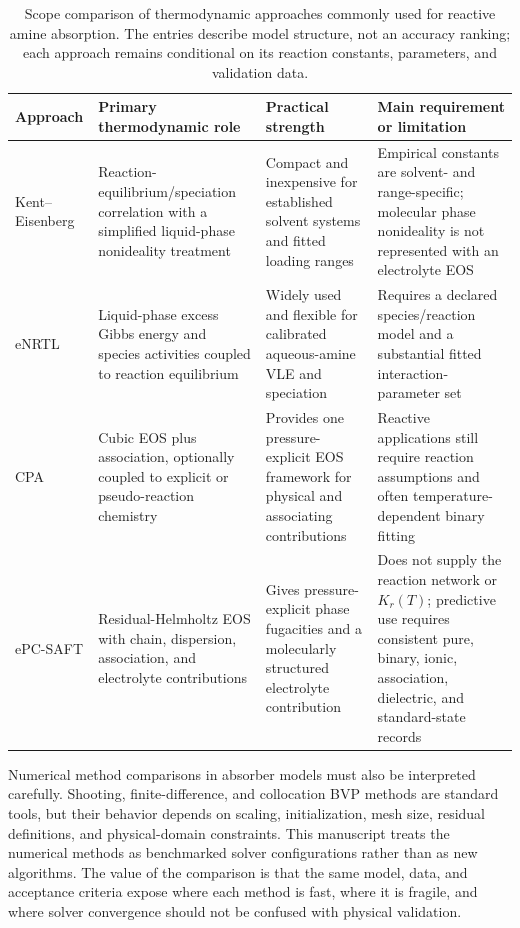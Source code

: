         \begin{table}
            \centering
            \small
            \caption{Scope comparison of thermodynamic approaches commonly used for reactive amine absorption. The entries describe model structure, not an accuracy ranking; each approach remains conditional on its reaction constants, parameters, and validation data.}
            \label{tab:thermodynamic-model-comparison}
            \begin{tabularx}{\textwidth}{>{\raggedright\arraybackslash}p{2.5cm}XXX}
                \toprule
                \textbf{Approach} & \textbf{Primary thermodynamic role} & \textbf{Practical strength} & \textbf{Main requirement or limitation} \\
                \midrule
                Kent--Eisenberg & Reaction-equilibrium/speciation correlation with a simplified liquid-phase nonideality treatment & Compact and inexpensive for established solvent systems and fitted loading ranges \cite{Shahid2019,Zhu2022} & Empirical constants are solvent- and range-specific; molecular phase nonideality is not represented with an electrolyte EOS \\
                eNRTL & Liquid-phase excess Gibbs energy and species activities coupled to reaction equilibrium & Widely used and flexible for calibrated aqueous-amine VLE and speciation \cite{Zhang2011} & Requires a declared species/reaction model and a substantial fitted interaction-parameter set \\
                CPA & Cubic EOS plus association, optionally coupled to explicit or pseudo-reaction chemistry & Provides one pressure-explicit EOS framework for physical and associating contributions \cite{Chen2023} & Reactive applications still require reaction assumptions and often temperature-dependent binary fitting \\
                ePC-SAFT & Residual-Helmholtz EOS with chain, dispersion, association, and electrolyte contributions & Gives pressure-explicit phase fugacities and a molecularly structured electrolyte contribution \cite{Cameretti2005,Bulow2021a} & Does not supply the reaction network or $K_r(T)$; predictive use requires consistent pure, binary, ionic, association, dielectric, and standard-state records \\
                \bottomrule
            \end{tabularx}
        \end{table}

        Numerical method comparisons in absorber models must also be interpreted carefully. Shooting, finite-difference, and collocation BVP methods are standard tools, but their behavior depends on scaling, initialization, mesh size, residual definitions, and physical-domain constraints. This manuscript treats the numerical methods as benchmarked solver configurations rather than as new algorithms. The value of the comparison is that the same model, data, and acceptance criteria expose where each method is fast, where it is fragile, and where solver convergence should not be confused with physical validation.

